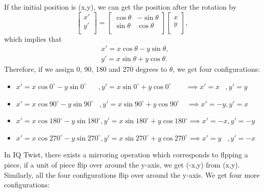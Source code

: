 If the initial position is (x,y), we can get the position after the rotation by
\begin{equation}
\label{equation:rotation}
\begin{bmatrix}
x'\\
y'\\
\end{bmatrix}
=\begin{bmatrix}
\cos\theta & -\sin\theta\\
\sin\theta & \cos\theta\\
\end{bmatrix}
\begin{bmatrix}
x\\
y\\
\end{bmatrix},
\end{equation}
which implies that 
\begin{equation}
\label{equation:formula1}
\begin{aligned}
&x'=x\cos\theta-y\sin\theta,\\
&y'=x\sin\theta+y\cos\theta.
\end{aligned}
\end{equation}
Therefore, if we assign 0, 90, 180 and 270 degrees to $\theta$, we get four configurations:
\begin{itemize}
  \item $x'=x\cos0^{\circ} - y\sin0^{\circ}\hspace{20pt},y'=x\sin0^{\circ} + y\cos0^{\circ}\hspace{24pt}\implies x'=x\hspace{10pt}, y'=y$
  \item $x'=x\cos90^{\circ} - y\sin90^{\circ}\hspace{10pt},y'=x\sin90^{\circ} + y\cos90^{\circ}\hspace{12pt}\implies x'=-y, y'=x$
  \item $x'=x\cos180^{\circ} - y\sin180^{\circ}, y'=x\sin180^{\circ} + y\cos180^{\circ} \implies x'=-x, y'=-y$
  \item $x'=x\cos270^{\circ} - y\sin270^{\circ}, y'=x\sin270^{\circ} + y\cos270^{\circ} \implies x'=y\hspace{10pt},y'=-x$
  \label{rotation4}
\end{itemize}
In IQ Twist, there exists a mirroring operation which corresponds to flpping a piece, if a unit of piece flip over around the y-axis, we get  (-x,y) from (x,y). Similarly, all the four configurations flip over around the y-axis. We get four more configurations: 
